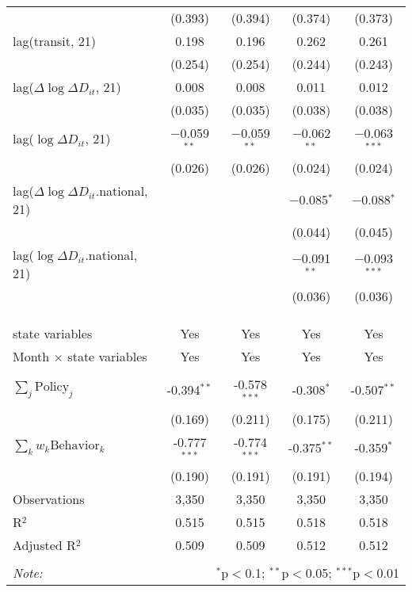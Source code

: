 \begin{tabular}{@{\extracolsep{1pt}}lcccc}
  & (0.393) & (0.394) & (0.374) & (0.373) \\ 
  lag(transit, 21) & 0.198 & 0.196 & 0.262 & 0.261 \\ 
  & (0.254) & (0.254) & (0.244) & (0.243) \\ 
  lag($\Delta \log \Delta D_{it}$, 21) & 0.008 & 0.008 & 0.011 & 0.012 \\ 
  & (0.035) & (0.035) & (0.038) & (0.038) \\ 
  lag($\log \Delta D_{it}$, 21) & $-$0.059$^{**}$ & $-$0.059$^{**}$ & $-$0.062$^{**}$ & $-$0.063$^{***}$ \\ 
  & (0.026) & (0.026) & (0.024) & (0.024) \\ 
  lag($\Delta \log \Delta D_{it}$.national, 21) &  &  & $-$0.085$^{*}$ & $-$0.088$^{*}$ \\ 
  &  &  & (0.044) & (0.045) \\ 
  lag($\log \Delta D_{it}$.national, 21) &  &  & $-$0.091$^{**}$ & $-$0.093$^{***}$ \\ 
  &  &  & (0.036) & (0.036) \\ 
   &  &  &  &  \\ 
  &  &  &  &  \\ 
 \hline \\[-1.8ex] 
state variables & Yes & Yes & Yes & Yes \\ 
Month $\times$ state variables & Yes & Yes & Yes & Yes \\ 
\hline \\[-1.8ex] 
$\sum_j \mathrm{Policy}_j$ & -0.394$^{**}$ & -0.578$^{***}$ & -0.308$^{*}$ & -0.507$^{**}$ \\ 
 & (0.169) & (0.211) & (0.175) & (0.211) \\ 
$\sum_k w_k \mathrm{Behavior}_k$ & -0.777$^{***}$ & -0.774$^{***}$ & -0.375$^{**}$ & -0.359$^{*}$ \\ 
 & (0.190) & (0.191) & (0.191) & (0.194) \\ 
Observations & 3,350 & 3,350 & 3,350 & 3,350 \\ 
R$^{2}$ & 0.515 & 0.515 & 0.518 & 0.518 \\ 
Adjusted R$^{2}$ & 0.509 & 0.509 & 0.512 & 0.512 \\ 
\hline 
\hline \\[-1.8ex] 
\textit{Note:}  & \multicolumn{4}{r}{$^{*}$p$<$0.1; $^{**}$p$<$0.05; $^{***}$p$<$0.01} \\ 
\end{tabular} 